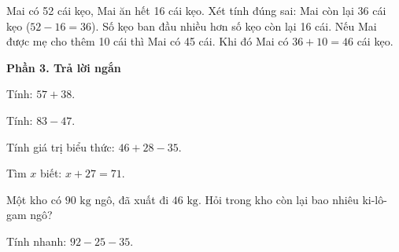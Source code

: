 \begin{ex} %
Mai có 52 cái kẹo, Mai ăn hết 16 cái kẹo. Xét tính đúng sai:
\choiceTF
{\True Mai còn lại 36 cái kẹo ($52 - 16 = 36$).}
{\True Số kẹo ban đầu nhiều hơn số kẹo còn lại 16 cái.}
{Nếu Mai được mẹ cho thêm 10 cái thì Mai có 45 cái.}
{\True Khi đó Mai có $36 + 10 = 46$ cái kẹo.}
\end{ex}

\textbf{Phần 3. Trả lời ngắn}

\begin{ex} %
Tính: $57 + 38$.
\end{ex}

\begin{ex} %
Tính: $83 - 47$.
\end{ex}

\begin{ex} %
Tính giá trị biểu thức: $46 + 28 - 35$.
\end{ex}

\begin{ex} %
Tìm $x$ biết: $x + 27 = 71$.
\end{ex}

\begin{ex} %
Một kho có $90\text{ kg}$ ngô, đã xuất đi $46\text{ kg}$. Hỏi trong kho còn lại bao nhiêu ki-lô-gam ngô?
\end{ex}

\begin{ex} %
Tính nhanh: $92 - 25 - 35$.
\end{ex}
